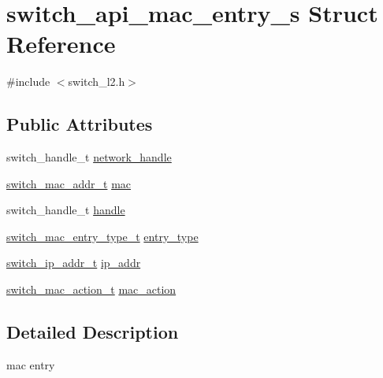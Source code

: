 \hypertarget{structswitch__api__mac__entry__s}{\section{switch\+\_\+api\+\_\+mac\+\_\+entry\+\_\+s Struct Reference}
\label{structswitch__api__mac__entry__s}
}


{\ttfamily \#include $<$switch\+\_\+l2.\+h$>$}

\subsection*{Public Attributes}
\begin{DoxyCompactItemize}
\item 
switch\+\_\+handle\+\_\+t \hyperlink{structswitch__api__mac__entry__s_aee7d57cd67dadc7cb70f4b1fc2c4a3a2}{network\+\_\+handle}
\item 
\hyperlink{structswitch__mac__addr__s}{switch\+\_\+mac\+\_\+addr\+\_\+t} \hyperlink{structswitch__api__mac__entry__s_a03cf7afcad902dd9fbe9c7a89f0c9c39}{mac}
\item 
switch\+\_\+handle\+\_\+t \hyperlink{structswitch__api__mac__entry__s_af912c454ac38b9cbdcc0c7620c4f9c0b}{handle}
\item 
\hyperlink{group__L2_gae4c546ddb72c6390d040cfa329cfe024}{switch\+\_\+mac\+\_\+entry\+\_\+type\+\_\+t} \hyperlink{structswitch__api__mac__entry__s_a6e81421d19c0e842cc55b1d181fea359}{entry\+\_\+type}
\item 
\hyperlink{structswitch__ip__addr__s}{switch\+\_\+ip\+\_\+addr\+\_\+t} \hyperlink{structswitch__api__mac__entry__s_aa6a4618e39c621f59350753214531f1e}{ip\+\_\+addr}
\item 
\hyperlink{group__L2_ga81675f7440ac9d8c53f957e4ec214cb1}{switch\+\_\+mac\+\_\+action\+\_\+t} \hyperlink{structswitch__api__mac__entry__s_ad971697f7c9e97d9cc9c09965aea6121}{mac\+\_\+action}
\end{DoxyCompactItemize}


\subsection{Detailed Description}
mac entry 

